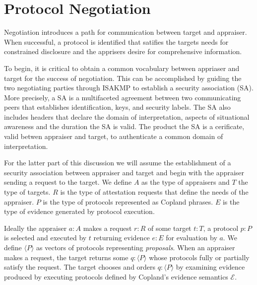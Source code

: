 \documentclass[sigconf,authordraft]{acmart}
\begin{document}

\section{Protocol Negotiation}

Negotiation introduces a path for
communication between target and appraiser. When successful, a protocol is identified
that satifies the targets needs for constrained disclosure and the
apprisers desire for comprehensive information.

To begin, it is critical to obtain a common vocabulary between appriaser and target for the success of negotiation. This can be accomplished by guiding the two negotiating parties through ISAKMP to establish a security association (SA).  More precisely,
a SA is a multifaceted agreement between two communicating peers that
establishes identification, keys, and security labels. The SA also
includes headers that declare the domain of interpretation, aspects of 
situational awareness and the duration the SA is valid. The product
the SA is a cerificate, valid betwen appraiser and target, to
authenticate a common domain of interpretation.



For the latter part of this discussion we will assume the
establishment of a security association between appraiser and target
and begin with the appraiser sending a request to the target.  We
define $A$ as the type of appraisers and $T$ the type of targets.  $R$
is the type of attestation requests that define the needs of the
appraiser.  $P$ is the type of protocols represented as Copland
phrases.  $E$ is the type of evidence generated by protocol execution.

Ideally the appraiser $a:A$ makes a request $r:R$ of some target
$t:T$, a protocol $p:P$ is selected and executed by $t$ returning
evidence $e:E$ for evaluation by $a$. We define $\langle P \rangle$ as
vectors of protocols representing \emph{proposals}.  When an appraiser
makes a request, the target returns some $q:\langle P \rangle$ whose
protocols fully or partially satisfy the request. The target chooses
and orders $q:\langle P\rangle$ by examining evidence produced by
executing protocols defined by Copland's evidence semantics
$\mathcal{E}$.
\end{document}
